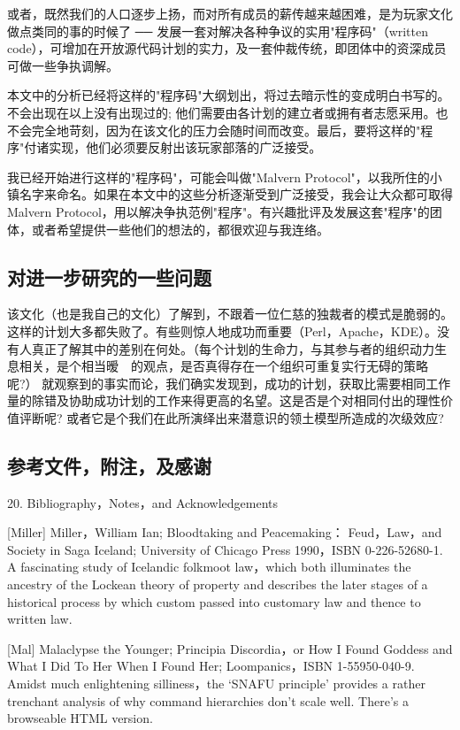 或者，既然我们的人口逐步上扬，而对所有成员的薪传越来越困难，是为玩家文化做点类同的事的时候了  ──  发展一套对解决各种争议的实用"程序码"（written code），可增加在开放源代码计划的实力，及一套仲裁传统，即团体中的资深成员可做一些争执调解。

本文中的分析已经将这样的"程序码"大纲划出，将过去暗示性的变成明白书写的。不会出现在以上没有出现过的; 他们需要由各计划的建立者或拥有者志愿采用。也不会完全地苛刻，因为在该文化的压力会随时间而改变。最后，要将这样的"程序"付诸实现，他们必须要反射出该玩家部落的广泛接受。

我已经开始进行这样的"程序码"，可能会叫做"Malvern Protocol"，以我所住的小镇名字来命名。如果在本文中的这些分析逐渐受到广泛接受，我会让大众都可取得Malvern Protocol，用以解决争执范例"程序"。有兴趣批评及发展这套"程序"的团体，或者希望提供一些他们的想法的，都很欢迎与我连络。

\subsection{对进一步研究的一些问题}
该文化（也是我自己的文化）了解到，不跟着一位仁慈的独裁者的模式是脆弱的。这样的计划大多都失败了。有些则惊人地成功而重要（Perl，Apache，KDE）。没有人真正了解其中的差别在何处。（每个计划的生命力，与其参与者的组织动力生息相关，是个相当暧　的观点，是否真得存在一个组织可重复实行无碍的策略呢?）
就观察到的事实而论，我们确实发现到，成功的计划，获取比需要相同工作量的除错及协助成功计划的工作来得更高的名望。这是否是个对相同付出的理性价值评断呢?  或者它是个我们在此所演绎出来潜意识的领土模型所造成的次级效应?

\subsection{参考文件，附注，及感谢}
20. Bibliography，Notes，and Acknowledgements

[Miller] Miller，William Ian; Bloodtaking and Peacemaking： Feud，Law，and Society in Saga Iceland; University of Chicago Press 1990，ISBN 0-226-52680-1. A fascinating study of Icelandic folkmoot law，which both illuminates the ancestry of the Lockean theory of property and describes the later stages of a historical process by which custom passed into customary law and thence to written law.

[Mal] Malaclypse the Younger; Principia Discordia，or How I Found Goddess and What I Did To Her When I Found Her; Loompanics，ISBN 1-55950-040-9. Amidst much enlightening silliness，the `SNAFU principle' provides a rather trenchant analysis of why command hierarchies don't scale well. There's a browseable HTML version.

